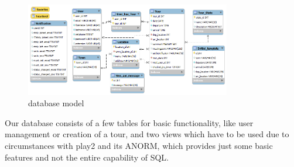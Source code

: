 \begin{figure}[ht]
	\centering
	\includegraphics[width=0.8\textwidth]{images/Datenbank_Model}
	\caption{database model}
	\label{img:DBMod}
\end{figure}
Our database consists of a few tables for basic functionality, like user management or creation of a tour, and two views which
have to be used due to circumstances with play2 and its ANORM, which provides just some basic features and not the entire
capability of SQL.